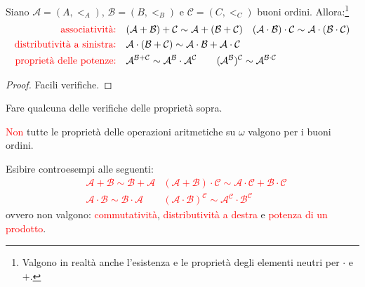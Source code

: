 \begin{proposition}
	Siano $\mathcal{A} = (A,<_A)$, $\mathcal{B} = (B,<_B)$ e $\mathcal{C} = (C,<_C)$ buoni ordini. Allora:\footnote{Valgono in realtà anche l'esistenza e le proprietà degli elementi neutri per $\cdot$ e $+$.}
	\[\begin{split}
		\text{\textcolor{red}{associatività:}} &\quad (\mathcal A + \mathcal B) + \mathcal C \sim \mathcal A + (\mathcal B + \mathcal C) \quad (\mathcal A \cdot \mathcal B) \cdot \mathcal C \sim \mathcal A \cdot (\mathcal B \cdot \mathcal C)\\
		\text{\textcolor{red}{distributività a sinistra:}} &\quad  \mathcal A \cdot (\mathcal B + \mathcal C) \sim \mathcal A \cdot \mathcal B + \mathcal A \cdot \mathcal C \\
		\text{\textcolor{red}{proprietà delle potenze:}} &\quad {\mathcal A}^{\mathcal B + \mathcal C} \sim \mathcal A^{\mathcal B} \cdot {\mathcal A}^{\mathcal C} \qquad ({\mathcal A}^{\mathcal B})^{\mathcal{C}} \sim {\mathcal A}^{\mathcal B \cdot \mathcal C}
	\end{split}\]
\end{proposition}

\begin{proof}
	Facili verifiche.
\end{proof}

\begin{exercise}
	Fare qualcuna delle verifiche delle proprietà sopra.
\end{exercise}

\textcolor{red}{Non} tutte le proprietà delle operazioni aritmetiche su $\omega$ valgono per i buoni ordini.

\begin{exercise}
	Esibire controesempi alle seguenti:
	\textcolor{red}{\begin{align*}
		& \mathcal A + \mathcal B \sim \mathcal B + \mathcal A &(\mathcal A + \mathcal B) \cdot \mathcal C \sim \mathcal A \cdot \mathcal C + \mathcal B \cdot \mathcal C \\
		& \mathcal A \cdot \mathcal B \sim \mathcal B \cdot \mathcal A &(\mathcal A \cdot \mathcal B)^{\mathcal C} \sim \mathcal A^{\mathcal C} \cdot \mathcal B^{\mathcal C}
	\end{align*}}
	ovvero non valgono: \textcolor{red}{commutatività}, \textcolor{red}{distributività a destra} e \textcolor{red}{potenza di un prodotto}.
\end{exercise}

